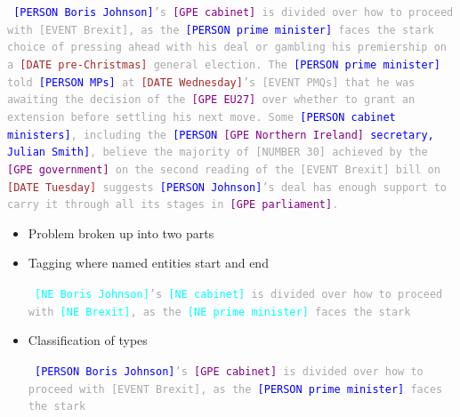 \documentclass[landscape]{jhuslides3C}
\begin{document}
\vfill
\textcolor{darkgrey}{\begin{flushleft} \tt
\newcommand{\person}[1]{\textcolor{blue}{{\small [PERSON} #1{\small ]}}}
\newcommand{\gpe}[1]{\textcolor{purple}{{\small [GPE} #1{\small ]}}}
\newcommand{\nedate}[1]{\textcolor{brown}{{\small [DATE} #1{\small ]}}}
\newcommand{\event}[1]{\textcolor{verydarkgreen}{{\small [EVENT} #1{\small ]}}}
\newcommand{\nenumber}[1]{\textcolor{verydarkred}{{\small [NUMBER} #1{\small ]}}}
\person{Boris Johnson}'s \gpe{cabinet} is divided over how to proceed with \event{Brexit}, as the \person{prime minister} faces the stark choice of pressing ahead with his deal or gambling his premiership on a \nedate{pre-Christmas} general election. The \person{prime minister} told \person{MPs} at \nedate{Wednesday}'s \event{PMQs} that he was awaiting the decision of the \gpe{EU27} over whether to grant an extension before settling his next move. Some \person{cabinet ministers}, including the \person{\gpe{Northern Ireland} secretary, Julian Smith}, believe the majority of \nenumber{30} achieved by the \gpe{government} on the second reading of the \event{Brexit} bill on \nedate{Tuesday} suggests \person{Johnson}'s deal has enough support to carry it through all its stages in \gpe{parliament}.
\end{flushleft}}
\vfill


\vfill
\begin{itemize}
\item Problem broken up into two parts
\item Tagging where named entities start and end
\textcolor{darkgrey}{\begin{flushleft} \tt
\newcommand{\person}[1]{\textcolor{cyan}{{\small [NE} #1{\small ]}}}
\newcommand{\gpe}[1]{\textcolor{cyan}{{\small [NE} #1{\small ]}}}
\newcommand{\event}[1]{\textcolor{cyan}{{\small [NE} #1{\small ]}}}
\person{Boris Johnson}'s \gpe{cabinet} is divided over how to proceed with \event{Brexit}, as the \person{prime minister} faces the stark
\end{flushleft}}

\item Classification of types
\textcolor{darkgrey}{\begin{flushleft} \tt
\newcommand{\person}[1]{\textcolor{blue}{{\small [PERSON} #1{\small ]}}}
\newcommand{\gpe}[1]{\textcolor{purple}{{\small [GPE} #1{\small ]}}}
\newcommand{\event}[1]{\textcolor{verydarkgreen}{{\small [EVENT} #1{\small ]}}}
\person{Boris Johnson}'s \gpe{cabinet} is divided over how to proceed with \event{Brexit}, as the \person{prime minister} faces the stark 
\end{flushleft}}

\end{itemize}
\vfill
\end{document}
